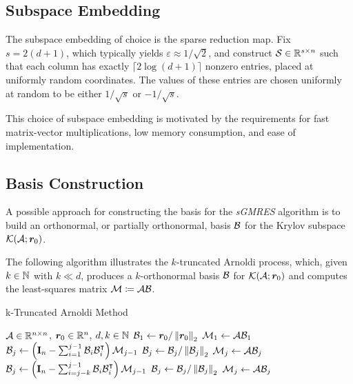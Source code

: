 \subsection{Subspace Embedding} \label{sseq:embdedding}

The subspace embedding of choice is the sparse reduction map. Fix $s = 2 \left( d + 1 \right)$, which typically yields $\varepsilon \approx 1 / \sqrt{2}$, and construct $\mathcal{S} \in \mathbb{R}^{s \times n}$ such that each column has exactly $\lceil 2 \log \left( d + 1 \right) \rceil$ nonzero entries, placed at uniformly random coordinates. The values of these entries are chosen uniformly at random to be either $1 / \sqrt{s}$ or $-1 / \sqrt{s}$.

This choice of subspace embedding is motivated by the requirements for fast matrix-vector multiplications, low memory consumption, and ease of implementation.

\subsection{Basis Construction} \label{sseq:basis}

A possible approach for constructing the basis for the \textit{sGMRES} algorithm is to build an orthonormal, or partially orthonormal, basis $\mathcal{B}$ for the Krylov subspace $\mathcal{K}(\mathcal{A}; \bm{r}_0)$.

The following algorithm illustrates the $k$-truncated Arnoldi process, which, given $k \in \mathbb{N}$ with $k \ll d$, produces a $k$-orthonormal basis $\mathcal{B}$ for $\mathcal{K}(\mathcal{A}; \bm{r}_0)$ and computes the least-squares matrix $\mathcal{M} \coloneqq \mathcal{A} \mathcal{B}$.

\begin{algorithm}
\caption{k-Truncated Arnoldi Method} \label{alg:arnoldi}
\begin{algorithmic}
\Require $\mathcal{A} \in \mathbb{R}^{n \times n}$, $\bm{r}_0 \in \mathbb{R}^{n}$, $d, k \in \mathbb{N}$
\State $\mathcal{B}_1 \gets \bm{r}_0 / \left\lVert \bm{r}_0 \right\rVert_2$
\State $\mathcal{M}_1 \gets \mathcal{A} \mathcal{B}_1$
    \State $\mathcal{B}_j \gets \left( \mathbf{I}_n - \sum_{i=1}^{j-1} \mathcal{B}_i \mathcal{B}_i^{\intercal} \right) \mathcal{M}_{j-1}$
    \State $\mathcal{B}_j \gets \mathcal{B}_j / \left\lVert \mathcal{B}_j \right\rVert_2$
    \State $\mathcal{M}_j \gets \mathcal{A} \mathcal{B}_j$
\EndFor
{}
    \State $\mathcal{B}_j \gets \left( \mathbf{I}_n - \sum_{i=j-k}^{j-1} \mathcal{B}_i \mathcal{B}_i^{\intercal} \right) \mathcal{M}_{j-1}$
    \State $\mathcal{B}_j \gets \mathcal{B}_j / \left\lVert \mathcal{B}_j \right\rVert_2$
    \State $\mathcal{M}_j \gets \mathcal{A} \mathcal{B}_j$
\EndFor
\end{algorithmic}
\end{algorithm}

